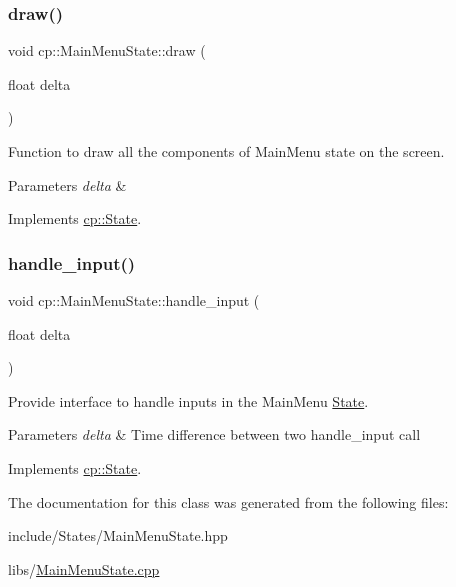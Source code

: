 \subsubsection{\texorpdfstring{draw()}{draw()}}
{\footnotesize\ttfamily void cp\+::\+Main\+Menu\+State\+::draw (\begin{DoxyParamCaption}\item[{float}]{delta }\end{DoxyParamCaption})\hspace{0.3cm}{\ttfamily [virtual]}}



Function to draw all the components of Main\+Menu state on the screen. 


\begin{DoxyParams}{Parameters}
{\em delta} & \\
\hline
\end{DoxyParams}


Implements \hyperlink{classcp_1_1_state}{cp\+::\+State}.

\mbox{\label{classcp_1_1_main_menu_state_a93e8ff7b27011d2f0bd0ad9a1da783e7}} 
\subsubsection{\texorpdfstring{handle\+\_\+input()}{handle\_input()}}
{\footnotesize\ttfamily void cp\+::\+Main\+Menu\+State\+::handle\+\_\+input (\begin{DoxyParamCaption}\item[{float}]{delta }\end{DoxyParamCaption})\hspace{0.3cm}{\ttfamily [virtual]}}



Provide interface to handle inputs in the Main\+Menu \hyperlink{classcp_1_1_state}{State}. 


\begin{DoxyParams}{Parameters}
{\em delta} & Time difference between two handle\+\_\+input call \\
\hline
\end{DoxyParams}


Implements \hyperlink{classcp_1_1_state}{cp\+::\+State}.



The documentation for this class was generated from the following files\+:\begin{DoxyCompactItemize}
\item 
include/\+States/Main\+Menu\+State.\+hpp\item 
libs/\hyperlink{_main_menu_state_8cpp}{Main\+Menu\+State.\+cpp}\end{DoxyCompactItemize}
